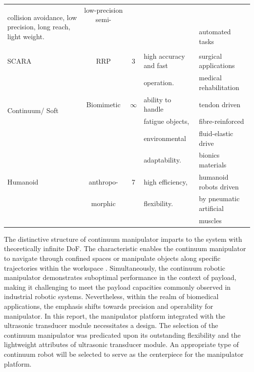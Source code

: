 \begin{center}
\begin{longtable}{l c c l l}
    \multirow{3}{*}{\parbox{40mm}{collision avoidance, low precision, long reach, light weight.}} &
    low-precision semi- \\
    & & & & automated tasks \cite{RRR_application1,RRR_application2}\\
    & & & & \\
    SCARA \cite{SCARA_review}& RRP & 3 & 
    high accuracy and fast  &
    surgical applications \cite{SCARA_application1}\\
    & & & operation. & medical rehabilitation \cite{SCARA_application2}\\
    \multirow{2}{25mm}{Continuum/ Soft \cite{soft_review1,soft_review2}} & Biomimetic & $\infty$ & 
    ability to handle  & 
    tendon driven \cite{tenden_driven_application1, tenden_driven_application2,tenden_driven_application3}\\
    & & & fatigue objects, & fibre-reinforced \cite{fiber_application1,fiber_application2}\\
    & & & environmental & fluid-elastic drive \cite{fluid_application1,fluid_application2,fluid_application3}\\
    & & & adaptability. & bionics materials \cite{SMA,dielectric_high-elastic_polymers,IPMC}\\
    Humanoid & anthropo- & 7 & high efficiency, & humanoid robots driven \\
    & morphic& & flexibility.& by pneumatic artificial\\ 
    & & & & muscles \cite{humanoid_7dof}\\ \hline
    \end{longtable}
\end{center}
\vspace{-10mm}
\noindent The distinctive structure of continuum manipulator imparts to the system with theoretically 
infinite DoF. The characteristic enables the continuum manipulator to navigate through confined spaces 
or manipulate objects along specific trajectories within the workspace \cite{CR_medical_application,
soft_review1,soft_review2}. Simultaneously, the continuum robotic
manipulator demonstrates suboptimal performance in the context of payload, making it challenging to meet 
the payload capacities commonly observed in industrial robotic systems. Nevertheless, within the realm 
of biomedical applications, the emphasis shifts towards precision and operability for manipulator. In this 
report, the manipulator platform integrated with the ultrasonic transducer module necessitates a design. 
The selection of the continuum manipulator was predicated upon its outstanding flexibility and the 
lightweight attributes of ultrasonic transducer module. An appropriate type of continuum robot 
will be selected to serve as the centerpiece for the manipulator platform.
